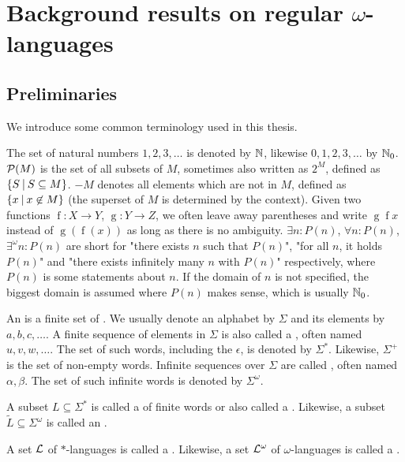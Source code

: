 \section{Background results on regular $\omega$-languages}
\label{chapter:regOmegaLangs}

\subsection{Preliminaries}
We introduce some common terminology used in this thesis.

The set of natural numbers $1,2,3,\dots$ is denoted by $\mathbb{N}$, likewise $0,1,2,3,\dots$ by $\mathbb{N}_0$. $\mathcal{P}(M)$ is the set of all subsets of $M$, sometimes also written as $2^M$, defined as $\Set{S}{S \subseteq M}$. $-M$ denotes all elements which are not in $M$, defined as $\Set{x}{x \not\in M}$ (the superset of $M$ is determined by the context). Given two functions $\operatorname{f} \colon X \rightarrow Y$, $\operatorname{g} \colon Y \rightarrow Z$, we often leave away parentheses and write $\operatorname{g} \operatorname{f} x$ instead of $\operatorname{g}(\operatorname{f}(x))$ as long as there is no ambiguity. $\exists n \colon P(n)$, $\forall n \colon P(n)$, $\exists^\omega n \colon P(n)$ are short for "there exists $n$ such that $P(n)$", "for all $n$, it holds $P(n)$" and "there exists infinitely many $n$ with $P(n)$" respectively, where $P(n)$ is some statements about $n$. If the domain of $n$ is not specified, the biggest domain is assumed where $P(n)$ makes sense, which is usually $\mathbb{N}_0$.

An  is a finite set of . We usually denote an alphabet by $\Sigma$ and its elements by $a, b, c, \dots$. A finite sequence of elements in $\Sigma$ is also called a , often named $u, v, w, \dots$. The set of such words, including the  $\epsilon$, is denoted by $\Sigma^*$. Likewise, $\Sigma^+$ is the set of non-empty words. Infinite sequences over $\Sigma$ are called , often named $\alpha, \beta$. The set of such infinite words is denoted by $\Sigma^\omega$.

A subset $L \subseteq \Sigma^*$ is called a  of finite words or also called a . Likewise, a subset $\tilde L \subseteq \Sigma^\omega$ is called an .

A set $\mathcal{L}$ of $*$-languages is called a . Likewise, a set $\mathcal{L}^\omega$ of $\omega$-languages is called a .

